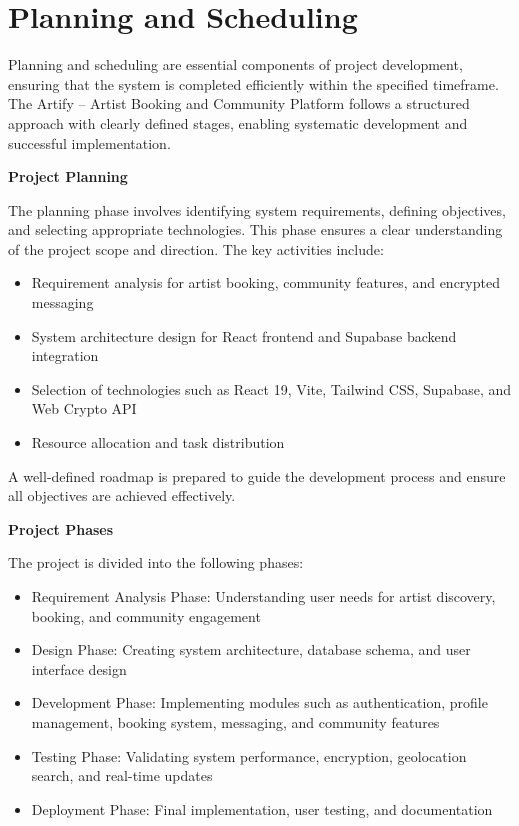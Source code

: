 \documentclass[12pt,a4paper]{report}
\begin{document}
\section{Planning and Scheduling}
Planning and scheduling are essential components of project development, ensuring that the system is completed efficiently within the specified timeframe. The Artify -- Artist Booking and Community Platform follows a structured approach with clearly defined stages, enabling systematic development and successful implementation.

\textbf{Project Planning}

The planning phase involves identifying system requirements, defining objectives, and selecting appropriate technologies. This phase ensures a clear understanding of the project scope and direction. The key activities include:

\begin{itemize}
\item Requirement analysis for artist booking, community features, and encrypted messaging
\item System architecture design for React frontend and Supabase backend integration
\item Selection of technologies such as React 19, Vite, Tailwind CSS, Supabase, and Web Crypto API
\item Resource allocation and task distribution
\end{itemize}

A well-defined roadmap is prepared to guide the development process and ensure all objectives are achieved effectively.

\textbf{Project Phases}

The project is divided into the following phases:

\begin{itemize}
\item Requirement Analysis Phase: Understanding user needs for artist discovery, booking, and community engagement
\item Design Phase: Creating system architecture, database schema, and user interface design
\item Development Phase: Implementing modules such as authentication, profile management, booking system, messaging, and community features
\item Testing Phase: Validating system performance, encryption, geolocation search, and real-time updates
\item Deployment Phase: Final implementation, user testing, and documentation
\end{itemize}
\end{document}
